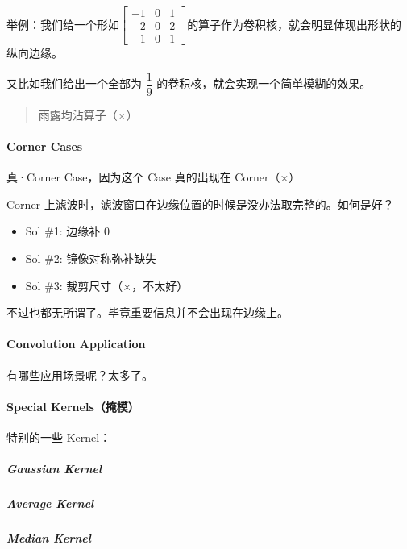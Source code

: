 \documentclass[
]{article}
\begin{document}
举例：我们给一个形如\( \left[ \begin{matrix}   -1 & 0 & 1 \\   -2 & 0 & 2 \\   -1 & 0 & 1\end{matrix}  \right]  \)的算子作为卷积核，就会明显体现出形状的纵向边缘。

又比如我们给出一个全部为 \(\dfrac 1 9\)
的卷积核，就会实现一个简单模糊的效果。

\begin{quote}
雨露均沾算子（×）
\end{quote}

\hypertarget{header-n22}{%
\paragraph{Corner Cases}\label{header-n22}}

真·Corner Case，因为这个 Case 真的出现在 Corner（×）

Corner 上滤波时，滤波窗口在边缘位置的时候是没办法取完整的。如何是好？

\begin{itemize}
\item
  Sol \#1: 边缘补 0
\item
  Sol \#2: 镜像对称弥补缺失
\item
  Sol \#3: 裁剪尺寸（×，不太好）
\end{itemize}

不过也都无所谓了。毕竟重要信息并不会出现在边缘上。

\hypertarget{header-n33}{%
\paragraph{Convolution Application}\label{header-n33}}

有哪些应用场景呢？太多了。

\hypertarget{header-n35}{%
\paragraph{Special Kernels（掩模）}\label{header-n35}}

特别的一些 Kernel：

\hypertarget{header-n37}{%
\subparagraph{Gaussian Kernel}\label{header-n37}}

\hypertarget{header-n38}{%
\subparagraph{Average Kernel}\label{header-n38}}

\hypertarget{header-n39}{%
\subparagraph{Median Kernel}\label{header-n39}}
\end{document}

